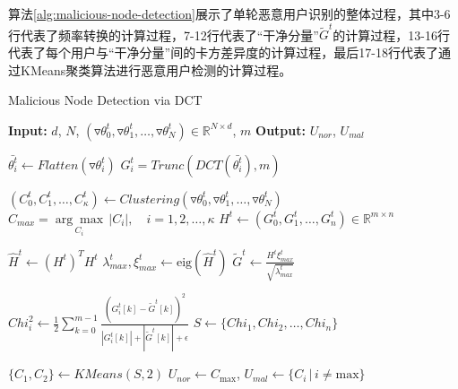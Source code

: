 \documentclass[lettersize,journal]{IEEEtran}
\begin{document}
算法\ref{alg:malicious-node-detection}展示了单轮恶意用户识别的整体过程，其中3-6行代表了频率转换的计算过程，7-12行代表了“干净分量”$\tilde G^t$的计算过程，13-16行代表了每个用户与“干净分量”间的卡方差异度的计算过程，最后17-18行代表了通过KMeans聚类算法进行恶意用户检测的计算过程。

\begin{algorithm}
\caption{Malicious Node Detection via DCT}
\label{alg:malicious-node-detection}
\begin{algorithmic}[1]
\State \textbf{Input:} $d$, $N$, $(\triangledown \theta_0^t, \triangledown \theta_1^t, \ldots, \triangledown \theta_N^t) \in \mathbb{R}^{N \times d}$, $m$ 
\State \textbf{Output:} $U_{nor}$, $U_{mal}$ 

    \State $\bar{\theta_i^t} \gets Flatten(\triangledown \theta_i^t)$
    \State $G_i^t = Trunc(DCT(\bar{\theta_i^t}), m)$ 
\EndFor


\State $(C_0^t, C_1^t, \ldots, C_{\kappa}^t) \gets Clustering (\triangledown \theta_0^t, \triangledown \theta_1^t, \ldots, \triangledown \theta_N^t)$
\State $ C_{max} = \underset{C_i}{\arg\max} \, |C_i|, \quad i = 1, 2, \ldots, \kappa $ 
\State $H^t \gets (G_0^t, G_1^t, \ldots, G_{n}^t) \in \mathbb{R}^{m \times n} $ 

\State $\hat{H}^t \gets (H^t)^{T} H^t$
\State $\lambda_{max}^t, \xi_{max}^t \gets \text{eig}(\hat{H}^t)$ 
\State $\tilde{G}^t \gets \frac{H^t \xi_{max}^t}{\sqrt{\lambda_{max}^t}}$ 


    \State ${Chi}_i^2 \gets \frac{1}{2} \sum_{k=0}^{m-1}\frac{(G_i^t[k] - {\tilde G}^t[k])^2}{|G_i^t[k]|+|{\tilde G}^t[k]| + \epsilon}$
\EndFor
\State $S \gets \{Chi_1, Chi_2, \ldots, Chi_n\}$ 


\State $\{C_1, C_2\} \gets KMeans(S, 2)$ 
\State $U_{nor} \gets C_{\text{max}}$, $U_{mal} \gets \{C_i \, | \, i \neq \text{max}\}$

\end{algorithmic}
\end{algorithm}
\end{document}
